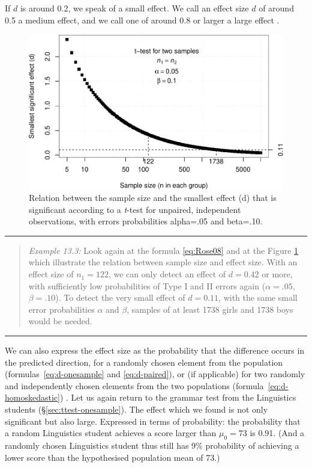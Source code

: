 \documentclass[
]{book}
\begin{document}
If \(d\) is around 0.2, we speak of a small effect. We call an effect size
\(d\) of around 0.5 a medium effect, and we call one
of around 0.8 or larger a large effect \citep{Cohen88, Rose08}.

\begin{figure}
\centering
\includegraphics{QMS-EN_files/figure-latex/smallestsignifdifference-1.pdf}
\caption{\label{fig:smallestsignifdifference}Relation between the sample size and the smallest effect (d) that is significant according to a \emph{t}-test for unpaired, independent observations, with errors probabilities alpha=.05 and beta=.10.}
\end{figure}

\begin{center}\rule{0.5\linewidth}{0.5pt}\end{center}

\begin{quote}
\emph{Example 13.3:}
Look again at the formula \eqref{eq:Rose08}
and at the Figure \ref{fig:smallestsignifdifference} which illustrate
the relation between sample size and effect size. With an
effect size of \(n_1=122\), we can only detect an effect of \(d=0.42\)
or more, with sufficiently low probabilities of Type I and II errors again
(\(\alpha=.05\), \(\beta=.10\)). To detect the very small effect of \(d=0.11\),
with the same small error probabilities \(\alpha\) and \(\beta\), samples
of at least 1738 girls and 1738 boys would be needed.
\end{quote}

\begin{center}\rule{0.5\linewidth}{0.5pt}\end{center}

We can also express the effect size as the probability that
the difference occurs in the predicted direction, for a randomly
chosen element from the population
(formulas~\eqref{eq:d-onesample} and \eqref{eq:d-paired}),
or (if applicable) for two
randomly and independently chosen elements from the two populations
(formula~\eqref{eq:d-homoskedastic}) \citep{McGraw92}. Let us again return to
the grammar test from the Linguistics students
(§\ref{sec:ttest-onesample}). The effect which we found is
not only significant but also large. Expressed in terms of probability:
the probability that a random Linguistics student achieves a score
larger than \(\mu_0=73\) is 0.91. (And a randomly chosen
Linguistics student thus still has 9\% probability of achieving a lower score than
the hypothesised population mean of 73.)
\end{document}
